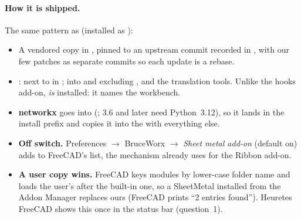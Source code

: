 \paragraph{How it is shipped.} The same pattern as  (installed as ):
\begin{itemize}[nosep]
  \item A vendored copy in , pinned to an upstream commit recorded in
        , with our few patches as separate \code{[BW]} commits so each update is a rebase.
  \item {}:  next to
         in ;  into
         and  excluding
        ,  and the translation tools. Unlike the hooks add-on, 
        \emph{is} installed: it names the workbench.
  \item \textbf{networkx} goes into  (; 3.6 and later need Python~3.12),
        so it lands in the install prefix and  copies it into the  with everything else.
  \item \textbf{Off switch.} Preferences $\rightarrow$ BruceWorx $\rightarrow$ \emph{Sheet metal add-on} (default on)
        adds  to FreeCAD's  list, the mechanism  already
        uses for the Ribbon add-on.
  \item \textbf{A user copy wins.} FreeCAD keys modules by lower-case folder name and loads the user's 
        after the built-in one, so a SheetMetal installed from the Addon Manager replaces ours (FreeCAD prints
        ``2 entries found''). Heuretes FreeCAD shows this once in the status bar (question~1).
\end{itemize}

